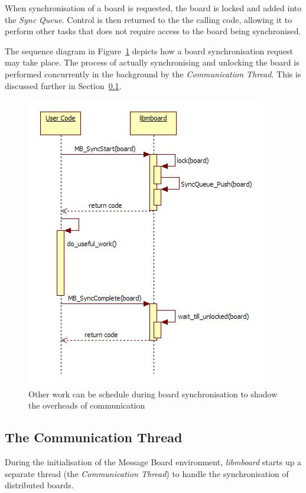 When synchronisation of a board is requested, the board is locked and added into the \textit{Sync Queue}. Control is then returned to the the calling code, allowing it to perform other tasks that does not require access to the board being synchronised. 

The sequence diagram in  Figure~\ref{fig:syncboard} depicts how a board synchronisation request may take place. The process of actually synchronising and unlocking the board is performed concurrently in the background by the \textit{Communication Thread}. This is discussed further in Section~\ref{sec:commthread}.

\begin{figure}[h]
 \centering
  \includegraphics[scale=0.70]{syncboard.jpg}
 \caption{Other work can be schedule during board synchronisation to shadow the overheads of communication}
 \label{fig:syncboard}
\end{figure}

\subsection{The Communication Thread}
\label{sec:commthread}

During the initialisation of the Message Board environment, \textit{libmboard} starts up a separate thread (the \textit{Communication Thread}) to handle the synchronisation of distributed boards. 

